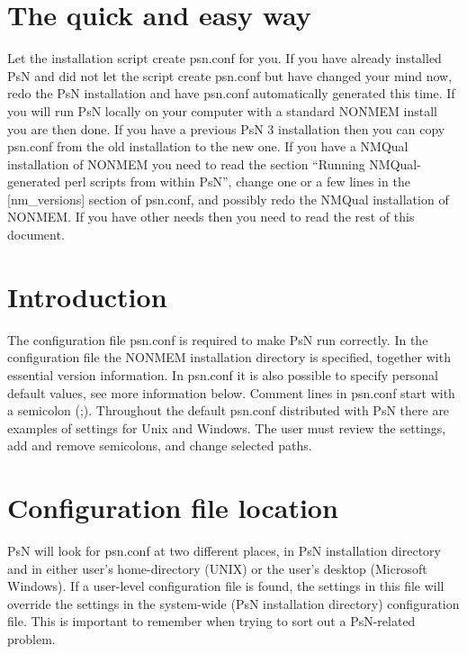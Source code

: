 



\maketitle

\section{The quick and easy way}
Let the installation script create psn.conf for you. If you have already installed PsN and did not let the script create psn.conf but have changed your mind now, redo the PsN installation and have psn.conf automatically generated this time. If you will run PsN locally on your computer with a standard NONMEM install you are then done.
If you have a previous PsN 3 installation then you can copy psn.conf from the old installation to the new one.
If you have a NMQual installation of NONMEM you need to read the section  “Running  NMQual-generated perl scripts from within PsN”, change one or a few lines in the [nm\_versions] section of psn.conf, and possibly redo the NMQual installation of NONMEM. 
If you have other needs then you need to read the rest of this document.

\section{Introduction}
The configuration file psn.conf is required to make PsN run correctly. In the configuration file the NONMEM installation directory is specified, together with essential version information. In psn.conf it is also possible to specify personal default values, see more information below. Comment lines in psn.conf start with a semicolon (;). Throughout the default psn.conf distributed with PsN there are examples of settings for Unix and Windows. The user must review the settings, add and remove semicolons, and change selected paths.

\section{Configuration file location}
PsN will look for psn.conf at two different places, in PsN installation directory and in either
user's home-directory (UNIX) or the user's desktop (Microsoft Windows). If a user-level configuration file is found, the settings in this file will override the settings in the system-wide (PsN installation directory) configuration file. This is important to remember when trying to sort out a PsN-related problem.


